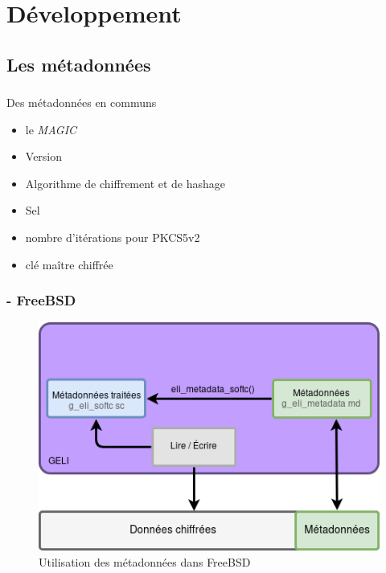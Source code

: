 \section{Développement}

\subsection{Les métadonnées}

\begin{frame}
	\frametitle{\insertsubsectionhead}
	\pause
	\begin{block}{Des métadonnées en communs}
		\begin{itemize}
			\pause
		\item le \textit{MAGIC}
			\pause
		\item Version
			\pause
		\item Algorithme de chiffrement et de hashage
			\pause
		\item Sel
			\pause
		\item nombre d'itérations pour PKCS5v2
			\pause
		\item clé maître chiffrée
		\end{itemize}
	\end{block}
\end{frame}

\begin{frame}
	\frametitle{\insertsubsectionhead - \textbf{FreeBSD}}
	\begin{figure}
		\includegraphics[width=.8\textwidth]{developpement/utilisation_metadonnee}
		\caption{Utilisation des métadonnées dans FreeBSD}
	\end{figure}
\end{frame}

